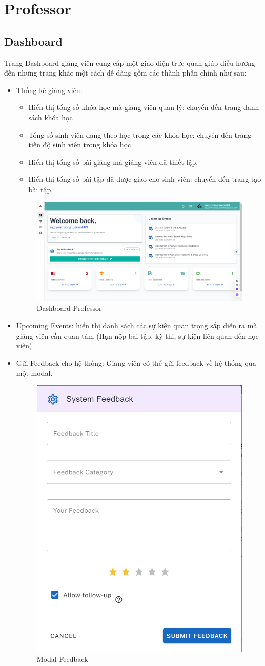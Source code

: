 \section{Professor}
\subsection{Dashboard}
Trang Dashboard giáng viên cung cấp một giao diện trực quan giúp điều hướng đến những trang khác một cách dễ dàng gồm các thành phần chính như sau:
\begin{itemize}
    \item Thống kê giảng viên:
    \begin{itemize}
        \item Hiển thị tổng số khóa học mà giảng viên quản lý: chuyển đến trang danh sách khóa học
        \item Tổng số sinh viên đang theo học trong các khóa học: chuyển đến trang tiến độ sinh viên trong khóa học
        \item Hiển thị tổng số bài giảng mà giảng viên đã thiết lập.
        \item Hiển thị tổng số bài tập đã được giao cho sinh viên: chuyển đến trang tạo bài tập.
    \end{itemize}
    \begin{figure}[H]
        \centering
        \includegraphics[width=0.8\linewidth]{images/dashboard_professor.png}
        \caption{Dashboard Professor}
        \label{fig:enter-label}
    \end{figure}
    \item Upcoming Events: hiển thị danh sách các sự kiện quan trọng sắp diễn ra mà giảng viên cần quan tâm (Hạn nộp bài tập, kỳ thi, sự kiện liên quan đến học viên)
    \item Gửi Feedback cho hệ thống: Giảng viên có thể gửi feedback về hệ thống qua một modal.
    \begin{figure}[H]
        \centering
        \includegraphics[width=0.3\linewidth]{images/modal_feedback.png}
        \caption{Modal Feedback}
        \label{fig:enter-label}
    \end{figure}
\end{itemize}
